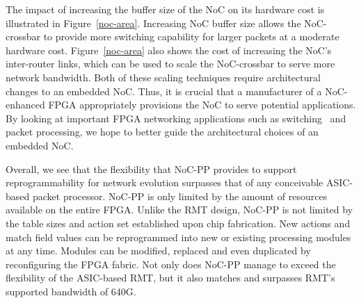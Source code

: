 The impact of increasing the buffer size of the NoC on its hardware cost is illustrated in Figure~\ref{noc-area}.
Increasing NoC buffer size allows the NoC-crossbar to provide more switching capability for larger packets at a moderate hardware cost.
Figure~\ref{noc-area} also shows the cost of increasing the NoC's inter-router links, which can be used to scale the NoC-crossbar to serve more network bandwidth.
Both of these scaling techniques require architectural changes to an embedded NoC.
Thus, it is crucial that a manufacturer of a NoC-enhanced FPGA appropriately provisions the NoC to serve potential applications.
By looking at important FPGA networking applications such as switching~\cite{bitar2014efficient,abdelfattah2015take} and packet processing, we hope to better guide the architectural choices of an embedded NoC.

\vspace{-0.1cm}

Overall, we see that the flexibility that NoC-PP provides to support reprogrammability for network evolution surpasses that of any conceivable ASIC-based packet processor.
NoC-PP is only limited by the amount of resources available on the entire FPGA.
Unlike the RMT design, NoC-PP is not limited by the table sizes and action set established upon chip fabrication.
New actions and match field values can be reprogrammed into new or existing processing modules at any time.
Modules can be modified, replaced and even duplicated by reconfiguring the FPGA fabric.
Not only does NoC-PP manage to exceed the flexibility of the ASIC-based RMT, but it also matches and surpasses RMT's supported bandwidth of 640G.



